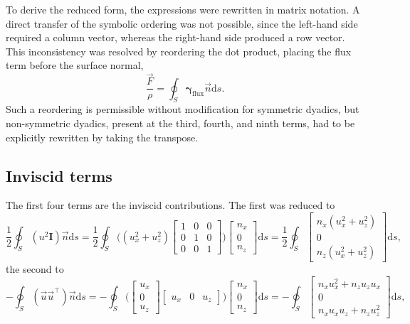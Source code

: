\documentclass[wes, manuscript]{copernicus}
\begin{document}
To derive the reduced form, the expressions were rewritten in matrix notation. A direct transfer of the symbolic ordering was not possible, since the left-hand side required a column vector, whereas the right-hand side produced a row vector. This inconsistency was resolved by reordering the dot product, placing the flux term before the surface normal,
\begin{equation}
 \frac{\vec{F}}{\rho} = \oint_{S} \boldsymbol{\gamma}_\textrm{flux} \vec{n}  \textrm{d}s .
\end{equation}
Such a reordering is permissible without modification for symmetric dyadics, but non-symmetric dyadics, present at the third, fourth, and ninth terms, had to be explicitly rewritten by taking the transpose.

\subsection{Inviscid terms}
The first four terms are the inviscid contributions. The first was reduced to
%
\begin{equation}
\frac{1}{2} \oint_{S} (u^{2}\mathbf{I}) \vec{n}  \textrm{d}s
= \frac{1}{2} \oint_{S} 
\Bigg(
(u_{{x}}^{2} + u_{{z}}^{2})
\begin{bmatrix} 1 & 0 & 0 \\ 0 & 1 & 0 \\ 0 & 0 & 1 \end{bmatrix}
\Bigg)
\begin{bmatrix} n_{{x}} \\ 0 \\ n_{{z}} \end{bmatrix} \textrm{d}s
= \frac{1}{2} \oint_{S}
\begin{bmatrix} n_{{x}}(u_{{x}}^{2}+u_{{z}}^{2}) \\ 0 \\ n_{{z}}(u_{{x}}^{2}+u_{{z}}^{2}) \end{bmatrix} \textrm{d}s ,
\end{equation}
%
the second to
%
\begin{equation}
-\!\oint_{S} (\vec{u}\vec{u}^{\top}) \vec{n}  \textrm{d}s
= -\!\oint_{S}
\Bigg(
\begin{bmatrix} u_{{x}} \\ 0 \\ u_{{z}} \end{bmatrix}
\begin{bmatrix} u_{{x}} & 0 & u_{{z}} \end{bmatrix}
\Bigg)
\begin{bmatrix} n_{{x}} \\ 0 \\ n_{{z}} \end{bmatrix} \textrm{d}s
= -\!\oint_{S}
\begin{bmatrix} n_{{x}}u_{{x}}^{2} + n_{{z}}u_{{z}}u_{{x}} \\ 0 \\ n_{{x}}u_{{x}}u_{{z}} + n_{{z}}u_{{z}}^{2} \end{bmatrix} \textrm{d}s ,
\end{equation}
\end{document}
